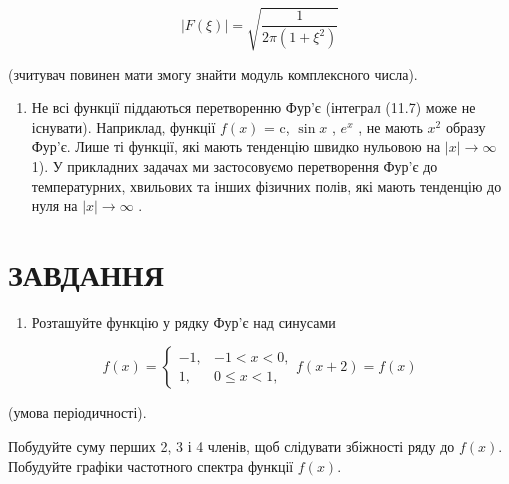 \documentclass[
  ukrainian,
]{article}
\providecommand{\tightlist}{%
  \setlength{\itemsep}{0pt}\setlength{\parskip}{0pt}}
\begin{document}
\[
|F(\xi)| = \sqrt{\frac{1}{2\pi(1+\xi^2)}}
\]

(зчитувач повинен мати змогу знайти модуль комплексного числа).

\begin{enumerate}
\def\labelenumi{\arabic{enumi}.}
\setcounter{enumi}{2}
\tightlist
\item
  Не всі функції піддаються перетворенню Фур'є (інтеграл (11.7) може не
  існувати). Наприклад, функції \(f(x)\) = c, \(\sin x\) , \(e^x\) , не
  мають \(x^2\) образу Фур'є. Лише ті функції, які мають тенденцію
  швидко нульовою на \(|x| \to \infty\) 1). У прикладних задачах ми
  застосовуємо перетворення Фур'є до температурних, хвильових та інших
  фізичних полів, які мають тенденцію до нуля на \(|x| \to \infty\) .
\end{enumerate}

\section{ЗАВДАННЯ}\label{ux437ux430ux432ux434ux430ux43dux43dux44f-8}

\begin{enumerate}
\def\labelenumi{\arabic{enumi}.}
\tightlist
\item
  Розташуйте функцію у рядку Фур'є над синусами
\end{enumerate}

\[
f(x) =
\begin{cases} -1, & -1 < x < 0, \\ 1, & 0 \le x < 1, \end{cases}
f(x+2) = f(x)
\]

(умова періодичності).

Побудуйте суму перших 2, 3 і 4 членів, щоб слідувати збіжності ряду до
\(f(x)\). Побудуйте графіки частотного спектра функції \(f(x)\).
\end{document}
